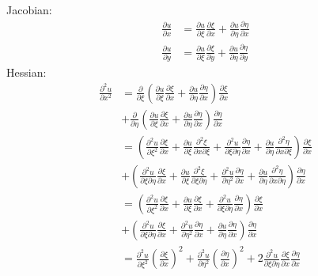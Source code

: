 \documentclass[twoside, 11pt, a4paper]{article}
\begin{document}
Jacobian:
\[
  \begin{split}
    \frac{\partial u}{\partial x} &= \frac{\partial u}{\partial\xi}\frac{\partial \xi}{\partial x} + \frac{\partial u}{\partial\eta}\frac{\partial \eta}{\partial x} \\
    \frac{\partial u}{\partial y} &= \frac{\partial u}{\partial\xi}\frac{\partial \xi}{\partial y} + \frac{\partial u}{\partial\eta}\frac{\partial \eta}{\partial y}
  \end{split}
\]
Hessian:
\[
  \begin{split}
    \frac{\partial^2 u}{\partial x^2} &= \frac{\partial}{\partial\xi}\left(\frac{\partial u}{\partial\xi}\frac{\partial \xi}{\partial x} + \frac{\partial u}{\partial\eta}\frac{\partial \eta}{\partial x}\right)\frac{\partial\xi}{\partial x} \\
    &+ \frac{\partial}{\partial\eta}\left(\frac{\partial u}{\partial\xi}\frac{\partial \xi}{\partial x} + \frac{\partial u}{\partial\eta}\frac{\partial \eta}{\partial x}\right)\frac{\partial\eta}{\partial x} \\
    &= \left(\frac{\partial^2u}{\partial\xi^2}\frac{\partial\xi}{\partial x}+\frac{\partial u}{\partial\xi}\frac{\partial^2\xi}{\partial x\partial\xi} + \frac{\partial^2u}{\partial\xi\partial\eta}\frac{\partial\eta}{\partial x}+\frac{\partial u}{\partial\eta}\frac{\partial^2\eta}{\partial x\partial\xi}\right)\frac{\partial\xi}{\partial x} \\
    &+\left(\frac{\partial^2 u}{\partial\xi\partial\eta}\frac{\partial\xi}{\partial x} + \frac{\partial u}{\partial \xi}\frac{\partial^2\xi}{\partial\xi\partial\eta} + \frac{\partial^2 u}{\partial\eta^2}\frac{\partial\eta}{\partial x} + \frac{\partial u}{\partial\eta}\frac{\partial^2\eta}{\partial x\partial\eta}\right)\frac{\partial\eta}{\partial x} \\
    &= \left(\frac{\partial^2u}{\partial\xi^2}\frac{\partial\xi}{\partial x}+\frac{\partial u}{\partial\xi}\frac{\partial\xi}{\partial x} + \frac{\partial^2u}{\partial\xi\partial\eta}\frac{\partial\eta}{\partial x}\right)\frac{\partial\xi}{\partial x} \\
    &+\left(\frac{\partial^2 u}{\partial\xi\partial\eta}\frac{\partial\xi}{\partial x} + \frac{\partial^2 u}{\partial\eta^2}\frac{\partial\eta}{\partial x} + \frac{\partial u}{\partial\eta}\frac{\partial\eta}{\partial x}\right)\frac{\partial\eta}{\partial x} \\
    &= \frac{\partial^2u}{\partial \xi^2}\left(\frac{\partial\xi}{\partial x}\right)^2 + \frac{\partial^2u}{\partial \eta^2}\left(\frac{\partial\eta}{\partial x}\right)^2 + 2 \frac{\partial^2u}{\partial\xi\partial\eta}\frac{\partial\xi}{\partial x}\frac{\partial\eta}{\partial x}
  \end{split}
\]
\end{document}
